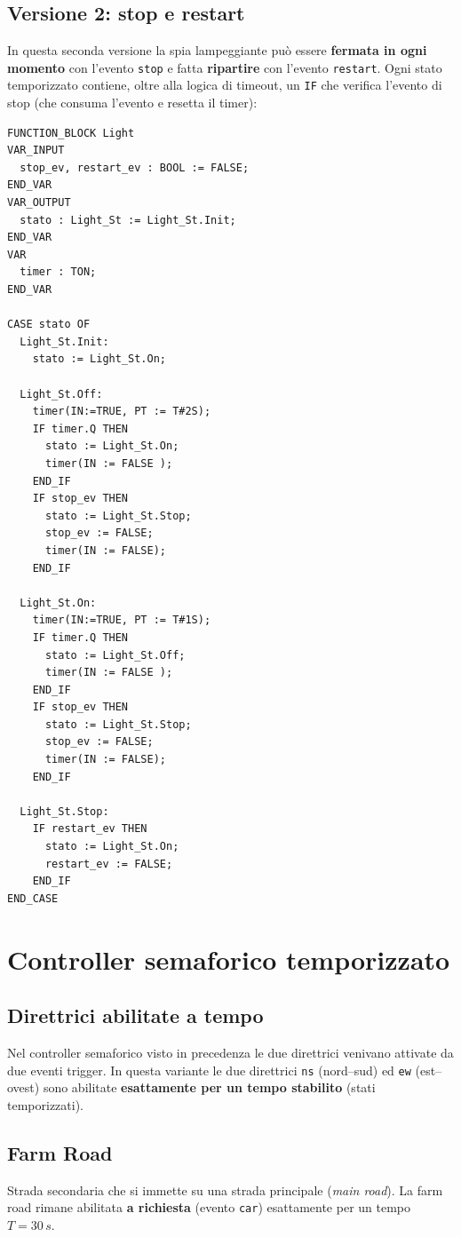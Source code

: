 \subsection{Versione 2: stop e restart}
In questa seconda versione la spia lampeggiante può essere \textbf{fermata in ogni momento} con l'evento \texttt{stop} e fatta \textbf{ripartire} con l'evento \texttt{restart}. Ogni stato temporizzato contiene, oltre alla logica di timeout, un \texttt{IF} che verifica l'evento di stop (che consuma l'evento e resetta il timer):
\begin{lstlisting}[basicstyle=\ttfamily\small]
FUNCTION_BLOCK Light
VAR_INPUT
  stop_ev, restart_ev : BOOL := FALSE;
END_VAR
VAR_OUTPUT
  stato : Light_St := Light_St.Init;
END_VAR
VAR
  timer : TON;
END_VAR

CASE stato OF
  Light_St.Init:
    stato := Light_St.On;

  Light_St.Off:
    timer(IN:=TRUE, PT := T#2S);
    IF timer.Q THEN
      stato := Light_St.On;
      timer(IN := FALSE );
    END_IF
    IF stop_ev THEN
      stato := Light_St.Stop;
      stop_ev := FALSE;
      timer(IN := FALSE);
    END_IF

  Light_St.On:
    timer(IN:=TRUE, PT := T#1S);
    IF timer.Q THEN
      stato := Light_St.Off;
      timer(IN := FALSE );
    END_IF
    IF stop_ev THEN
      stato := Light_St.Stop;
      stop_ev := FALSE;
      timer(IN := FALSE);
    END_IF

  Light_St.Stop:
    IF restart_ev THEN
      stato := Light_St.On;
      restart_ev := FALSE;
    END_IF
END_CASE
\end{lstlisting}

\section{Controller semaforico temporizzato}
\subsection{Direttrici abilitate a tempo}
Nel controller semaforico visto in precedenza le due direttrici venivano attivate da due eventi trigger. In questa variante le due direttrici \texttt{ns} (nord--sud) ed \texttt{ew} (est--ovest) sono abilitate \textbf{esattamente per un tempo stabilito} (stati temporizzati).

\subsection{Farm Road}
\begin{defn}
Strada secondaria che si immette su una strada principale (\emph{main road}). La farm road rimane abilitata \textbf{a richiesta} (evento \texttt{car}) esattamente per un tempo $T = 30\,s$.
\end{defn}

